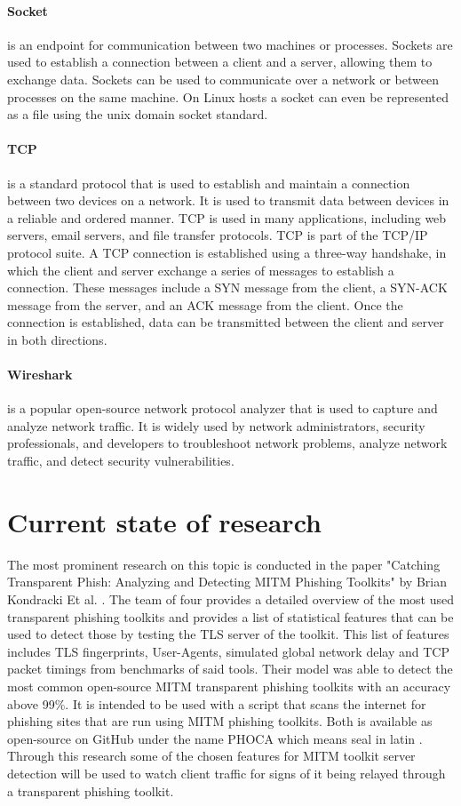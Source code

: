 \documentclass[12pt]{scrbook}
\begin{document}
\paragraph{Socket} is an endpoint for communication between two machines or
processes. Sockets are used to establish a connection between a client and a
server, allowing them to exchange data. Sockets can be used to communicate over
a network or between processes on the same machine. On Linux hosts a socket can
even be represented as a file using the unix domain socket standard.

\paragraph{TCP} is a standard protocol that is used to establish and maintain a
connection between
two devices on a network. It is used to transmit data between devices in a
reliable and ordered manner. TCP is used in many applications, including web
servers,
email servers, and file transfer protocols. TCP is part of the TCP/IP protocol
suite.
A TCP connection is established using a three-way handshake, in which the client
and server
exchange a series of messages to establish a connection. These messages include
a SYN message
from the client, a SYN-ACK message from the server, and an ACK message from the
client.
Once the connection is established, data can be transmitted between the client
and server in both directions.

\paragraph{Wireshark} is a popular open-source network protocol
analyzer that is used to capture and analyze network traffic. It is widely used
by network administrators, security professionals, and developers to
troubleshoot network problems, analyze network traffic, and detect security
vulnerabilities.

\newpage \section{Current state of research}
The most prominent research on this topic is conducted in the paper
"Catching Transparent Phish: Analyzing and Detecting MITM Phishing Toolkits"
by Brian Kondracki Et al. \cite{kondracki2021catching}.
The team of four provides a detailed overview of the most used transparent
phishing toolkits and provides a list of statistical features that can be used to detect
those by testing the TLS server of the toolkit.
This list of features includes TLS fingerprints, User-Agents, simulated global
network delay and TCP packet timings from benchmarks of said tools.
Their model was able to detect the most common open-source MITM transparent
phishing toolkits with an accuracy above 99\%.
It is intended to be used with a script that scans the internet for phishing
sites that are run using MITM phishing toolkits.
Both is available as open-source on GitHub under the name PHOCA which means seal
in latin \cite{kondracki2021catchingGit}.
Through this research some of the chosen features for MITM toolkit server
detection will be used to watch client traffic for signs of it being relayed
through a transparent phishing toolkit.
\end{document}
